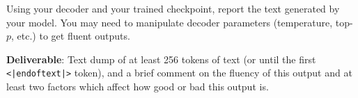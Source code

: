 \begin{answer}



\end{answer}


Using your decoder and your trained checkpoint, report the text generated by your model. You may need to manipulate decoder parameters (temperature, top-$p$, etc.) to get fluent outputs.

\textbf{Deliverable}: Text dump of at least 256 tokens of text (or until the first \lstinline{<|endoftext|>} token), and a brief comment on the fluency of this output and at least two factors which affect how good or bad this output is.

\begin{answer}

\end{answer}


